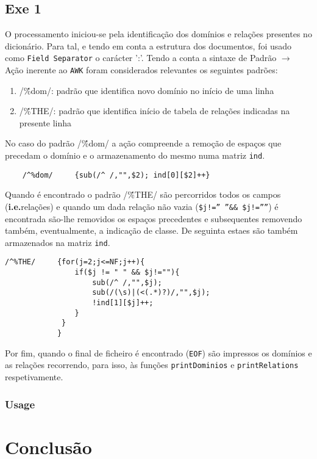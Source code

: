 \documentclass{llncs}
\begin{document}
\subsection{Exe 1}
O processamento iniciou-se pela identificação dos domínios e relações presentes no dicionário. Para tal, e tendo em conta a estrutura dos documentos, foi usado como \texttt{Field Separator} o carácter ':'.
Tendo a conta a sintaxe de Padrão $\to$ Ação inerente ao \texttt{AWK} foram considerados relevantes os seguintes padrões:
\begin{enumerate}
        \item /\^ \%dom/: padrão que identifica novo domínio no início de uma linha
        \item /\^ \%THE/: padrão que identifica início de tabela de relações indicadas na presente linha
\end{enumerate}
No caso do padrão /\^\%dom/ a ação compreende a remoção de espaços que precedam o domínio e o armazenamento do mesmo numa matriz \texttt{ind}.
\begin{Verbatim}
    /^%dom/     {sub(/^ /,"",$2); ind[0][$2]++}
\end{Verbatim}
Quando é encontrado o padrão /\^\%THE/ são percorridos todos os campos (\textbf{i.e.}relações) e quando um dada relação não vazia (\texttt{\$j!='' ''\&\& \$j!=''''}) é encontrada são-lhe removidos os espaços precedentes e subsequentes removendo também, eventualmente, a indicação de classe. De seguinta estaes são também armazenados na matriz \texttt{ind}.
\begin{Verbatim}
/^%THE/     {for(j=2;j<=NF;j++){
                if($j != " " && $j!=""){
                    sub(/^ /,"",$j);           
                    sub(/(\s)|(<(.*)?)/,"",$j);
                    !ind[1][$j]++;
                }                              
             }
            }

\end{Verbatim}

Por fim, quando o final de ficheiro é encontrado (\texttt{EOF}) são impressos os domínios e as relações recorrendo, para isso, às funções \texttt{printDominios} e \texttt{printRelations} respetivamente.

\subsubsection{Usage}

\section{Conclusão}
\end{document}
